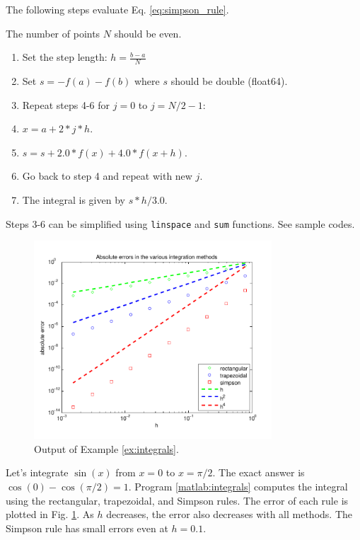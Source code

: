 \begin{myalgobox}
    \label{algo:simpson rule}
    
    \medskip
    The following steps evaluate Eq. \ref{eq:simpson_rule}.
    
    The number of points $N$ should be even.
    \medskip
    \begin{enumerate}
        \item Set the step length: $h=\displaystyle\frac{b-a}{N}$
        \item Set $s=-f(a)-f(b)$ where $s$ should be double (float64).
        \item Repeat steps 4-6 for $j=0$ to $j=N/2-1$:
        \item $x=a+2*j*h$.
        \item $s=s+2.0*f(x)+4.0*f(x+h)$. 
        \item Go back to step 4 and repeat with new $j$.
        \item The integral is given by $s*h/3.0$.
    \end{enumerate}

\bigskip
Steps 3-6 can be simplified using \texttt{linspace} and \texttt{sum} functions. See sample codes.
\end{myalgobox}


\begin{figure}[b]
	\centerline{\includegraphics[width=3.5in]{03.integrals/integral-plot.pdf}}
	\caption{Output of Example \ref{ex:integrals}.}
	\label{fig:integrals}
\end{figure}

\bigskip
\begin{example}\label{ex:integrals}

Let's integrate $\sin(x)$ from $x=0$ to $x=\pi/2$.  The exact answer is
$\cos(0)-\cos(\pi/2)=1$. Program \ref{matlab:integrals} computes the integral  using the rectangular, trapezoidal, and Simpson rules.
The error of each rule is plotted in Fig. \ref{fig:integrals}. As $h$ decreases, the error also decreases with all methods.  The Simpson rule has small errors even at $h=0.1$.
\end{example}


